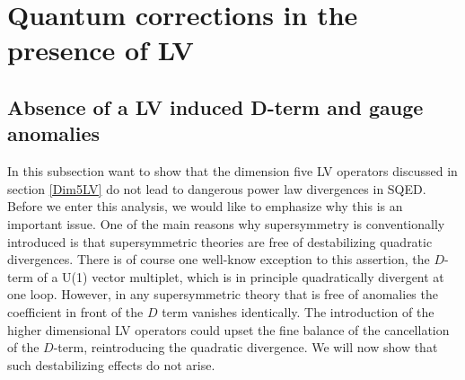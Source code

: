\documentclass[12pt]{revtex4}
\begin{document}
\section{Quantum corrections in the presence of LV}
\label{quantum}




\subsection{Absence of a LV induced D-term and gauge anomalies}
\label{noDterm}

In this subsection want to show that the dimension five LV operators
discussed in section \ref{Dim5LV} do not lead to dangerous power 
law divergences in SQED. Before we enter this analysis, we would like
to emphasize why this is an important issue. One of the main reasons
why supersymmetry is conventionally introduced is that 
supersymmetric theories are free of destabilizing quadratic
divergences. There is of course one well-know 
exception to this assertion, the $D$-term of a U(1) vector multiplet,
which is in principle quadratically divergent at one loop. 
However, in any supersymmetric theory that is free of anomalies the
coefficient in front of the $D$ term vanishes identically. The introduction of the
higher dimensional LV operators could upset the fine balance of the
cancellation of the $D$-term, reintroducing the quadratic
divergence. We will now show that such destabilizing effects do not
arise. 
\end{document}

